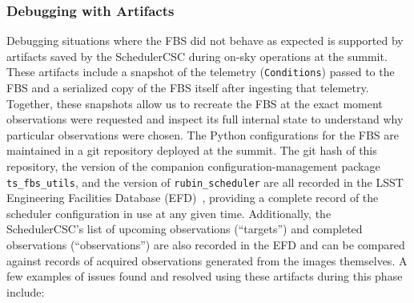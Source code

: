 \subsubsection{Debugging with Artifacts}
\label{sec:debugging}

Debugging situations where the FBS did not behave as expected is supported by
artifacts saved by the SchedulerCSC during on-sky operations at the summit.
These artifacts include a snapshot of the telemetry (\texttt{Conditions}) passed
to the FBS and a serialized copy of the FBS itself after ingesting that
telemetry. Together, these snapshots allow us to recreate the FBS at the exact
moment observations were requested and inspect its full internal state to
understand why particular observations were chosen. The Python configurations
for the FBS are maintained in a git repository deployed at the summit. The git
hash of this repository, the version of the companion configuration-management
package \texttt{ts\_fbs\_utils}, and the version of \texttt{rubin\_scheduler}
are all recorded in the LSST Engineering Facilities Database (EFD)~\cite{2024SPIE13101E..1MF}, providing a
complete record of the scheduler configuration in use at any given time.
Additionally, the SchedulerCSC's list of upcoming observations (``targets'')
and completed observations (``observations'') are also recorded in the EFD and
can be compared against records of acquired observations generated from the
images themselves. A few examples of issues found and resolved using these 
artifacts during this phase include:
%
